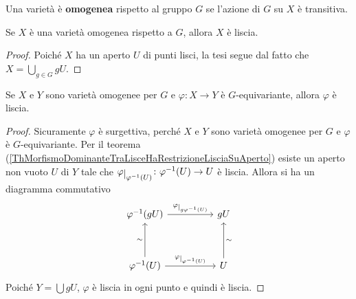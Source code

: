 \begin{definition}
Una variet\`a \`e \textbf{omogenea} rispetto al gruppo $G$ se l'azione di $G$ su $X$ \`e transitiva.
\end{definition}

\begin{corollary}
    Se $X$ è una varietà omogenea rispetto a $G$, allora $X$ è liscia.
\end{corollary}
\begin{proof}
    Poiché $X$ ha un aperto $U$ di punti lisci, la tesi segue dal fatto che $X=\bigcup_{g\in G} gU$.
\end{proof}


\begin{corollary}\label{CorEquivarianteTraVarietaOmogeneeELiscia}
    Se $X$ e $Y$ sono varietà omogenee per $G$ e $\varphi\colon X \to Y$ è $G$-equivariante, allora $\varphi$ è liscia.
\end{corollary}
\begin{proof}
    Sicuramente $\varphi$ è surgettiva, perché $X$ e $Y$ sono varietà omogenee per $G$ e $\varphi$ è $G$-equivariante. Per il teorema (\ref{ThMorfismoDominanteTraLisceHaRestrizioneLisciaSuAperto}) esiste un aperto non vuoto $U$ di $Y$ tale che $\varphi\res{\varphi^{-1}(U)}\colon \varphi^{-1}(U) \to U$ è liscia. Allora si ha un diagramma commutativo %
\[\begin{tikzcd}
	{\varphi^{-1}(gU)} && gU \\
	\\
	{\varphi^{-1}(U)} && U
	\arrow["{\varphi\res{g\varphi^{-1}(U)}}", from=1-1, to=1-3]
	\arrow["\sim", from=3-1, to=1-1]
	\arrow["{\varphi\res{\varphi^{-1}(U)}}", from=3-1, to=3-3]
	\arrow["\sim"', from=3-3, to=1-3]
\end{tikzcd}\] 
Poiché $Y=\bigcup gU$, $\varphi$ è liscia in ogni punto e quindi è liscia.

\end{proof}









